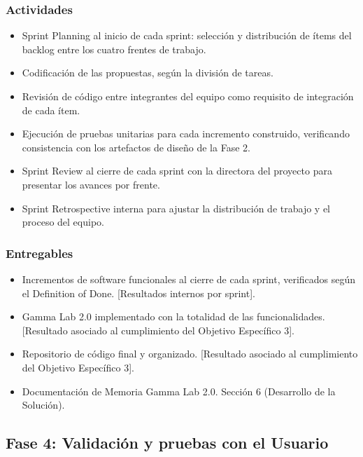 \documentclass[12pt,letterpaper]{article}
\begin{document}
\subsubsection{Actividades}

\begin{itemize}
  \item Sprint Planning al inicio de cada sprint: selección y distribución de ítems del backlog entre los cuatro frentes de trabajo.
  \item Codificación de las propuestas, según la división de tareas.
  \item Revisión de código entre integrantes del equipo como requisito de integración de cada ítem.
  \item Ejecución de pruebas unitarias para cada incremento construido, verificando consistencia con los artefactos de diseño de la Fase 2.
  \item Sprint Review al cierre de cada sprint con la directora del proyecto para presentar los avances por frente.
  \item Sprint Retrospective interna para ajustar la distribución de trabajo y el proceso del equipo.
\end{itemize}

\subsubsection{Entregables}

\begin{itemize}
  \item Incrementos de software funcionales al cierre de cada sprint, verificados según el Definition of Done. [Resultados internos por sprint].
  \item Gamma Lab 2.0 implementado con la totalidad de las funcionalidades. [Resultado asociado al cumplimiento del Objetivo Específico 3].
  \item Repositorio de código final y organizado. [Resultado asociado al cumplimiento del Objetivo Específico 3].
  \item Documentación de Memoria Gamma Lab 2.0. Sección 6 (Desarrollo de la Solución).
\end{itemize}

\subsection{Fase 4: Validación y pruebas con el Usuario}
\end{document}
